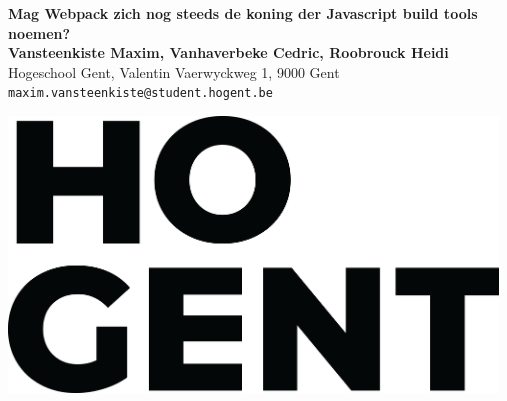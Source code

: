 \begin{minipage}[t]{0.75\linewidth}
\VeryHuge \color{HoGentAccent1} \textbf{Mag Webpack zich nog steeds de koning der Javascript build tools noemen?} \color{Black}\\ %
\huge \textbf{Vansteenkiste Maxim, Vanhaverbeke Cedric, Roobrouck Heidi}\\[0.5cm] %
\huge Hogeschool Gent, Valentin Vaerwyckweg 1, 9000 Gent\\[0.4cm] %
\Large \texttt{maxim.vansteenkiste@student.hogent.be} \\
\end{minipage}
%
\begin{minipage}[t]{0.25\linewidth}
\includegraphics[width=13cm,right]{figures/HOGENT_Logo_Pos_rgb.png} 

\end{minipage}

\vspace{1cm} %


